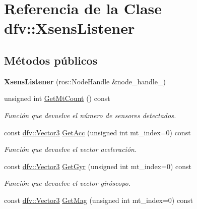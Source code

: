 \hypertarget{classdfv_1_1XsensListener}{\section{\-Referencia de la \-Clase dfv\-:\-:\-Xsens\-Listener}
\label{classdfv_1_1XsensListener}
}
\subsection*{\-Métodos públicos}
\begin{DoxyCompactItemize}
\item 
\hypertarget{classdfv_1_1XsensListener_a545d4b10d2c34166d82bc41403e39a00}{{\bfseries \-Xsens\-Listener} (ros\-::\-Node\-Handle \&node\-\_\-handle\-\_\-)}\label{classdfv_1_1XsensListener_a545d4b10d2c34166d82bc41403e39a00}

\item 
\hypertarget{classdfv_1_1XsensListener_a5d31c2bd34dcbd18c60634e994c02ed3}{unsigned int \hyperlink{classdfv_1_1XsensListener_a5d31c2bd34dcbd18c60634e994c02ed3}{\-Get\-Mt\-Count} () const }\label{classdfv_1_1XsensListener_a5d31c2bd34dcbd18c60634e994c02ed3}

\begin{DoxyCompactList}\small\item\em \-Función que devuelve el número de sensores detectados. \end{DoxyCompactList}\item 
\hypertarget{classdfv_1_1XsensListener_a940577a890abfe31a9f765766abbb0ec}{const \hyperlink{classdfv_1_1Vector3}{dfv\-::\-Vector3} \hyperlink{classdfv_1_1XsensListener_a940577a890abfe31a9f765766abbb0ec}{\-Get\-Acc} (unsigned int mt\-\_\-index=0) const }\label{classdfv_1_1XsensListener_a940577a890abfe31a9f765766abbb0ec}

\begin{DoxyCompactList}\small\item\em \-Función que devuelve el vector aceleración. \end{DoxyCompactList}\item 
\hypertarget{classdfv_1_1XsensListener_a3896a0a58d557a5e9299415a146d80ed}{const \hyperlink{classdfv_1_1Vector3}{dfv\-::\-Vector3} \hyperlink{classdfv_1_1XsensListener_a3896a0a58d557a5e9299415a146d80ed}{\-Get\-Gyr} (unsigned int mt\-\_\-index=0) const }\label{classdfv_1_1XsensListener_a3896a0a58d557a5e9299415a146d80ed}

\begin{DoxyCompactList}\small\item\em \-Función que devuelve el vector giróscopo. \end{DoxyCompactList}\item 
\hypertarget{classdfv_1_1XsensListener_a5eb779af51de20f10434711cb06ea153}{const \hyperlink{classdfv_1_1Vector3}{dfv\-::\-Vector3} \hyperlink{classdfv_1_1XsensListener_a5eb779af51de20f10434711cb06ea153}{\-Get\-Mag} (unsigned int mt\-\_\-index=0) const }\label{classdfv_1_1XsensListener_a5eb779af51de20f10434711cb06ea153}


\end{DoxyCompactItemize}
